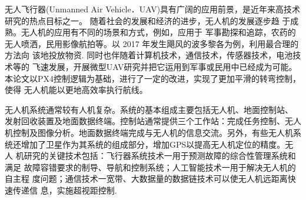 无人飞行器(Unmanned Air Vehicle．UAV)具有广阔的应用前景，是近年来高技术研究的热点目标之一。
    随着社会的发展和经济的进步，无人机的发展逐步趋
于成熟。无人机的应用有不同的场景和方式，例如，应用于
军事勘探和追踪，农药的无人喷洒，民用影像航拍等。以
2017 年发生飓风的波多黎各为例，利用最合理的方法向
该地投放物资. 同时也伴随着计算机技术，通信技术，传感器技术，电池技术等的
    飞速发展，开展微型UAV研究并把它运用到军事或民用中已经成为可能。
    本论文以PX4控制逻辑为基础，进行了一定的改进，实现了更加平滑的转弯控制，使得
    无人机能以更地高效率执行航线。\par
    无人机系统通常较有人机复杂。系统的基本组成主要包括无人机、地面控制站、
发射回收装置及地面数据终端。控制站通常提供三个工作站：完成任务控制、无人
机控制及图像分析。地面数据终端完成与无人机的信息交流。另外，有些无人机系
统还增加了卫星作为其系统的组成部分，增加GPS以提高无人机定位的精度。无人
机研究的关键技术包括：飞行器系统技术一用于预测故障的综合性管理系统和满足
故障容错要求的制导、导航和控制系统；人工智能技术一用于解决无人机的自主程
度问题；通信技术一宽带、大数据量的数据链技术可以使无人机远距离快速传递信
息，实施超视距控制.